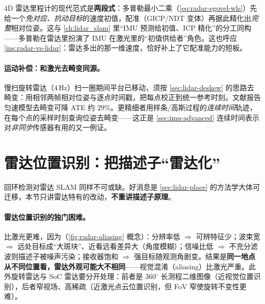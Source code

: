 \begin{insight}\label{ins:radar-doppler-reg}
$4$D 雷达里程计的现代范式是\textbf{两段式}：多普勒最小二乘（\cref{eq:radar-egovel-wls}）先给一个\emph{免对应、抗动目标}的速度初值，配准（GICP/NDT 变体）再据此精化出\emph{完整}相对位姿。这与 \cref{ch:lidar_slam} 里“IMU 预测给初值、ICP 精化”的分工同构——多普勒在雷达里扮演了 IMU 在激光里的“初值供给者”角色。这也呼应 \cref{ins:radar-vs-lidar}：雷达多出的那一维速度，恰好补上了它配准能力的短板。
\end{insight}

\paragraph{运动补偿：和激光去畸变同源。}
慢扫旋转雷达（$4$\,Hz）扫一圈期间平台已移动，须按 \cref{sec:lidar-deskew} 的思路去畸变：用相邻两帧相对位姿与逐点时间戳，把每点校正到统一参考时刻。文献报告匀速模型去畸变可降 ATE 约 $29\%$\cite{carlone2026handbook}。更精细者用样条/高斯过程的\emph{连续时间}轨迹，在每个点的采样时刻查询位姿去畸变——这正是 \cref{sec:imu-advanced} 连续时间表示对\emph{非同步}传感器有用的又一例证。

\section{雷达位置识别：把描述子“雷达化”}
\label{sec:radar-place}

回环检测对雷达 SLAM 同样不可或缺。好消息是 \cref{sec:lidar-place} 的方法学大体可迁移，本节只讲雷达特有的改动，\textbf{不重讲描述子原理}。

\paragraph{雷达位置识别的独门困难。}
比激光更难，因为（\cref{fig:radar-aliasing} 概念）\cite{carlone2026handbook}：分辨率低 $\Rightarrow$ 可辨特征少；波束宽 $\Rightarrow$ 远处目标成“大斑块”、近看远看差异大（角度模糊）；信噪比低 $\Rightarrow$ 不充分滤波则描述子被噪声污染；接收器饱和 $\Rightarrow$ 强目标随观测角剧变。结果是\textbf{同一地点从不同位置看，雷达外观可能大不相同}——视觉混淆（aliasing）比激光严重。此外旋转雷达与 SoC 雷达要分开处理：前者是 $360^\circ$ 长测程二维图像（近视觉位置识别），后者窄视场、高稀疏（近激光点云位置识别，但 FoV 窄使旋转不变性更难）。

